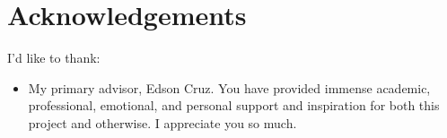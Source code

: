 \documentclass[twoside]{report}
\date{}
\let\oldsection\section
\renewcommand\section{\clearpage\oldsection}
\begin{document}


\pagecolor{white}
\def\contentsname{\empty}
\begin{multicols*}{2}
 \tableofcontents
\end{multicols*}


\section{Acknowledgements}

I'd like to thank:

\begin{itemize}
 \item
       My primary advisor, Edson Cruz. You have provided
       immense academic, professional, emotional, and personal support and
       inspiration for both this project and otherwise. I appreciate you so much.
\end{itemize}
\end{document}
